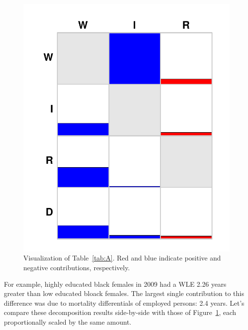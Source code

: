 \documentclass{article}
\begin{document}
\begin{figure}[ht!]
\begin{center}
\caption{Visualization of Table~\ref{tab:A}. Red and blue indicate positive and
negative contributions, respectively. }
\label{fig:deca}
\includegraphics[scale=.5]{Figures/decA.pdf}
\end{center}
\end{figure}

For example, highly educated black females in 2009 had a WLE 2.26 years greater
than low educated bloack females. The largest single contribution to this
difference was due to mortality differentials of employed persons: 2.4 years.
Let's compare these decomposition results side-by-side with those of
Figure~\ref{fig:deca}, each proportionally scaled by the same amount.
\end{document}
